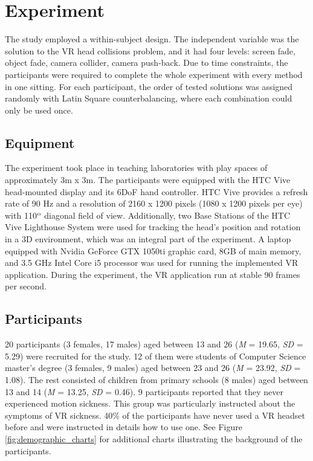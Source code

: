 \section{Experiment}

The study employed a within-subject design. The independent variable was the solution to the VR head collisions problem, and it had four levels: screen fade, object fade, camera collider, camera push-back. Due to time constraints, the participants were required to complete the whole experiment with every method in one sitting. For each participant, the order of tested solutions was assigned randomly with Latin Square counterbalancing, where each combination could only be used once.

\subsection{Equipment}

The experiment took place in teaching laboratories with play spaces of approximately 3m x 3m. The participants were equipped with the HTC Vive head-mounted display and its 6DoF hand controller. HTC Vive provides a refresh rate of 90 Hz and a resolution of 2160 x 1200 pixels (1080 x 1200 pixels per eye) with 110$\textsuperscript{o}$ diagonal field of view. Additionally, two Base Stations of the HTC Vive Lighthouse System were used for tracking the head's position and rotation in a 3D environment, which was an integral part of the experiment. A laptop equipped with Nvidia GeForce GTX 1050ti graphic card, 8GB of main memory, and 3.5 GHz Intel Core i5 processor was used for running the implemented VR application. During the experiment, the VR application run at stable 90 frames per second.

\subsection{Participants}

20 participants (3 females, 17 males) aged between 13 and 26 (\textit{M} = 19.65, \textit{SD} = 5.29) were recruited for the study. 12 of them were students of Computer Science master's degree (3 females, 9 males) aged between 23 and 26 (\textit{M} = 23.92, \textit{SD} = 1.08). The rest consisted of children from primary schools (8 males) aged between 13 and 14 (\textit{M} = 13.25, \textit{SD} = 0.46). 9 participants reported that they never experienced motion sickness. This group was particularly instructed about the symptoms of VR sickness. 40\% of the participants have never used a VR headset before and were instructed in details how to use one. See Figure \ref{fig:demographic_charts} for additional charts illustrating the background of the participants.

